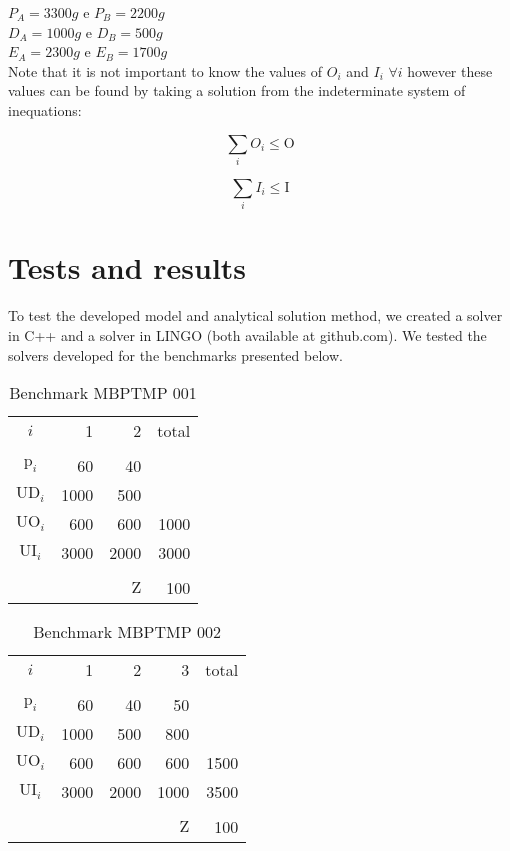\documentclass[preprint,12pt,authoryear]{elsarticle}
\begin{document}
$P_A = 3300g$ e $P_B=2200g$ \\

$D_A = 1000g$ e $D_B = 500g$ \\

$E_A = 2300g$ e $E_B = 1700g$ \\

Note that it is not important to know the values of $O_i$ and $I_i$ $\forall i$ however these values can be found by taking a solution from the indeterminate system of inequations:

\begin{equation}
\sum_i{O_i} \leq \textrm{O}
\end{equation}

\begin{equation}
\sum_i{I_i} \leq \textrm{I}
\end{equation}

\section{Tests and results}
\label{}

To test the developed model and analytical solution method, we created a solver in C++ and a solver in LINGO (both available at github.com). We tested the solvers developed for the benchmarks presented below. 

\begin{table}[h]
\begin{center}
\begin{tabular}[c]{c r r r}
$i$ & 1 & 2 & total \\
\cline {1-4} \\
$\textrm{p}_i$ & 60 & 40 & \\
$\textrm{UD}_i$ & 1000 & 500 & \\
$\textrm{UO}_i$ & 600 & 600 & 1000 \\
$\textrm{UI}_i$ & 3000 & 2000 & 3000 \\
\cline {1-4} \\
& & $\textrm{Z}$ & 100 \\
\end{tabular}
\label{tab:MBPTMP 001}
\caption{Benchmark MBPTMP 001}
\end{center}
\end{table}

\begin{table}[h]
\begin{center}
\begin{tabular}[c]{c r r r r}
$i$ & 1 & 2 & 3 & total \\
\cline {1-5} \\
$\textrm{p}_i$ & 60 & 40 & 50 \\
$\textrm{UD}_i$ & 1000 & 500 & 800 \\
$\textrm{UO}_i$ & 600 & 600 & 600 & 1500 \\
$\textrm{UI}_i$ & 3000 & 2000 & 1000 & 3500 \\
\cline {1-5} \\
& & & $\textrm{Z}$ & 100 \\
\end{tabular}
\label{tab:MBPTMP 001}
\caption{Benchmark MBPTMP 002}
\end{center}
\end{table}
\end{document}
